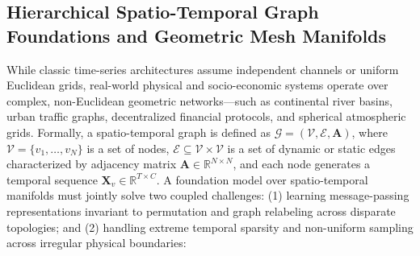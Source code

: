 \subsection{Hierarchical Spatio-Temporal Graph Foundations and Geometric Mesh Manifolds}
\label{sec:hierarchical_graph_manifolds}

While classic time-series architectures assume independent channels or uniform Euclidean grids, real-world physical and socio-economic systems operate over complex, non-Euclidean geometric networks—such as continental river basins, urban traffic graphs, decentralized financial protocols, and spherical atmospheric grids. Formally, a spatio-temporal graph is defined as $\mathcal{G} = (\mathcal{V}, \mathcal{E}, \mathbf{A})$, where $\mathcal{V} = \{v_1, \dots, v_N\}$ is a set of nodes, $\mathcal{E} \subseteq \mathcal{V} \times \mathcal{V}$ is a set of dynamic or static edges characterized by adjacency matrix $\mathbf{A} \in \mathbb{R}^{N \times N}$, and each node generates a temporal sequence $\mathbf{X}_{v} \in \mathbb{R}^{T \times C}$. A foundation model over spatio-temporal manifolds must jointly solve two coupled challenges: (1) learning message-passing representations invariant to permutation and graph relabeling across disparate topologies; and (2) handling extreme temporal sparsity and non-uniform sampling across irregular physical boundaries:
